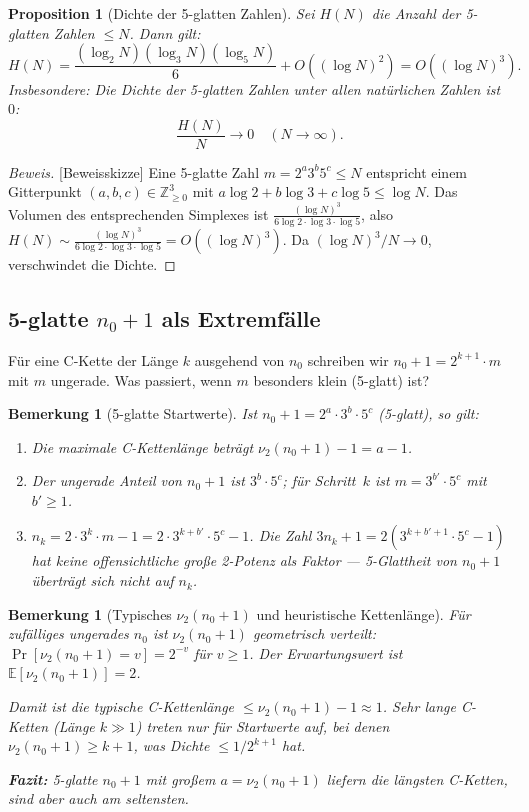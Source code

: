 \documentclass[12pt,a4paper]{article}
\newtheorem{proposition}[definition]{Proposition}
\newtheorem{bemerkung}[definition]{Bemerkung}
\newenvironment{beweis}{\begin{proof}[Beweis]}{\end{proof}}
\newcommand{\vii}{\nu_2}
\newcommand{\Z}{\mathbb{Z}}
\begin{document}
\begin{proposition}[Dichte der 5-glatten Zahlen]
\label{prop:dichte-5glatt}
Sei $H(N)$ die Anzahl der 5-glatten Zahlen $\leq N$. Dann gilt:
\[
  H(N) = \frac{(\log_2 N)(\log_3 N)(\log_5 N)}{6} + O\!\left((\log N)^2\right)
       = O\!\left((\log N)^3\right).
\]
Insbesondere: Die Dichte der 5-glatten Zahlen unter allen natürlichen Zahlen
ist~$0$:
\[
  \frac{H(N)}{N} \to 0 \quad (N \to \infty).
\]
\end{proposition}

\begin{beweis}[Beweisskizze]
Eine 5-glatte Zahl $m = 2^a 3^b 5^c \leq N$ entspricht einem Gitterpunkt
$(a,b,c) \in \Z_{\geq 0}^3$ mit $a\log 2 + b\log 3 + c\log 5 \leq \log N$.
Das Volumen des entsprechenden Simplexes ist
$\frac{(\log N)^3}{6 \log 2 \cdot \log 3 \cdot \log 5}$, also
$H(N) \sim \frac{(\log N)^3}{6\log 2 \cdot \log 3 \cdot \log 5} = O((\log N)^3)$.
Da $(\log N)^3 / N \to 0$, verschwindet die Dichte. \qedhere
\end{beweis}

\subsection{5-glatte $n_0+1$ als Extremfälle}

Für eine C-Kette der Länge $k$ ausgehend von $n_0$ schreiben wir
$n_0+1 = 2^{k+1} \cdot m$ mit $m$ ungerade. Was passiert, wenn $m$ besonders
klein (5-glatt) ist?

\begin{bemerkung}[5-glatte Startwerte]
Ist $n_0 + 1 = 2^a \cdot 3^b \cdot 5^c$ (5-glatt), so gilt:
\begin{enumerate}[label=(\roman*)]
  \item Die maximale C-Kettenlänge beträgt $\vii(n_0+1) - 1 = a - 1$.
  \item Der ungerade Anteil von $n_0+1$ ist $3^b \cdot 5^c$; für Schritt~$k$
    ist $m = 3^{b'} \cdot 5^c$ mit $b' \geq 1$.
  \item $n_k = 2 \cdot 3^k \cdot m - 1 = 2 \cdot 3^{k+b'} \cdot 5^c - 1$.
    Die Zahl $3n_k+1 = 2(3^{k+b'+1}\cdot 5^c - 1)$ hat keine offensichtliche
    große 2-Potenz als Faktor --- 5-Glattheit von $n_0+1$ überträgt sich
    \emph{nicht} auf $n_k$.
\end{enumerate}
\end{bemerkung}

\begin{bemerkung}[Typisches $\vii(n_0+1)$ und heuristische Kettenlänge]
Für zufälliges ungerades $n_0$ ist $\vii(n_0+1)$ geometrisch verteilt:
$\Pr[\vii(n_0+1) = v] = 2^{-v}$ für $v \geq 1$.
Der Erwartungswert ist $\mathbb{E}[\vii(n_0+1)] = 2$.

Damit ist die \emph{typische} C-Kettenlänge $\leq \vii(n_0+1) - 1 \approx 1$.
Sehr lange C-Ketten (Länge $k \gg 1$) treten nur für Startwerte auf, bei
denen $\vii(n_0+1) \geq k+1$, was Dichte $\leq 1/2^{k+1}$ hat.

\textbf{Fazit:} 5-glatte $n_0+1$ mit großem $a = \vii(n_0+1)$ liefern die
längsten C-Ketten, sind aber auch am seltensten.
\end{bemerkung}
\end{document}
